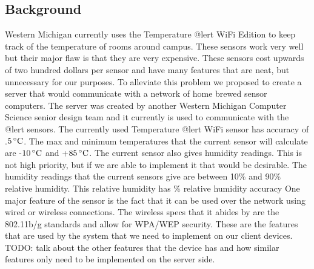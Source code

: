 \documentclass{report}
\begin{document}
\subsection*{Background}
	Western Michigan currently uses the Temperature @lert WiFi Edition to keep track of the temperature of rooms around campus. These sensors work very well but their major flaw is that they are very expensive. These sensors cost upwards of two hundred dollars per sensor and have many features that are neat, but unnecessary for our purposes. To alleviate this problem we proposed to create a server that would communicate with a network of home brewed sensor computers. The server was created by another Western Michigan Computer Science senior design team and it currently is used to communicate with the @lert sensors.  
	\newline
	\indent
	The currently used Temperature @lert WiFi sensor has accuracy of \pm.$5\,^{\circ}{\rm C}$. The max and minimum temperatures that the current sensor will calculate are -$10\,^{\circ}{\rm C}$ and +$85\,^{\circ}{\rm C}$. The current sensor also gives humidity readings. This is not high priority, but if we are able to implement it that would be desirable. The humidity readings that the current sensors give are between 10\% and 90\% relative humidity. This relative humidity has \% relative humidity accuracy One major feature of the sensor is the fact that it can be used over the network using wired or wireless connections. The wireless specs that it abides by are the 802.11b/g standards and allow for WPA/WEP security. These are the features that are used by the system that we need to implement on our client devices.
	\newline
	\indent
	TODO: talk about the other features that the device has and how similar features only need to be implemented on the server side.
	\newline
	\indent
\newpage

	
\end{document}

